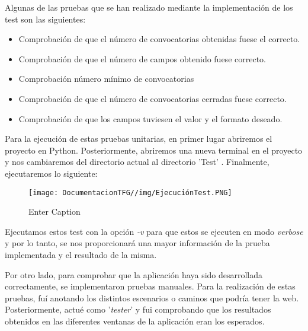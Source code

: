 Algunas de las pruebas que se han realizado mediante la implementación de los test son las siguientes:

\begin{itemize}
    \item Comprobación de que el número de convocatorias obtenidas fuese el correcto.
    \item Comprobación de que el número de campos obtenido fuese correcto.
    \item Comprobación número mínimo de convocatorias
    \item Comprobación de que el número de convocatorias cerradas fuese correcto.
    \item Comprobación de que los campos tuviesen el valor y el formato deseado.
\end{itemize}

Para la ejecución de estas pruebas unitarias, en primer lugar abriremos el proyecto en Python. Posteriormente, abriremos una nueva terminal en el proyecto y nos cambiaremos del directorio actual al directorio 'Test' . Finalmente, ejecutaremos lo siguiente: 

\begin{figure}[H]
    \centering
    \texttt{[image: DocumentacionTFG//img/EjecuciónTest.PNG]}
    \caption{Enter Caption}
\end{figure}

Ejecutamos estos test con la opción \textit{-v} para que estos se ejecuten en modo \textit{verbose} y por lo tanto, se nos proporcionará una mayor información de la prueba implementada y el resultado de la misma.

Por otro lado, para comprobar que la aplicación haya sido desarrollada correctamente, se implementaron pruebas manuales. Para la realización de estas pruebas, fuí anotando los distintos escenarios o caminos que podría tener la web. Posteriormente, actué como '\textit{tester}' y fui comprobando que los resultados obtenidos en las diferentes ventanas de la aplicación eran los esperados.
